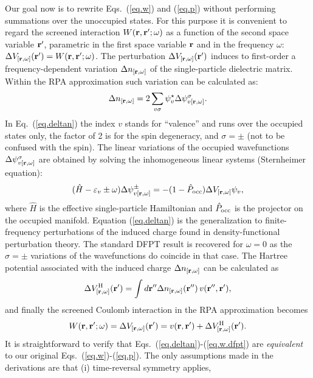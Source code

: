 \documentclass[twocolumn,prb,showpacs,superscriptaddress]{revtex4}
\def\w{\omega}
\def\H{\hat{H}}
\def\P{\hat{P}_{\rm occ}}
\def\E{\varepsilon}
\def\s{\sigma}
\def\r{{\bf r}}
\def\rp{{\bf r^\prime}}
\def\rpp{{\bf r^{\prime\prime}}}
\begin{document}
Our goal now is to rewrite Eqs.\ (\ref{eq.w}) and (\ref{eq.p})
without performing summations over the unoccupied states.
For this purpose it is convenient to regard the screened interaction
$W(\r,\rp;\w)$ as a function of the 
second space variable $\rp$, parametric in the first space variable 
$\r$ and in the frequency $\w$: $\Delta V_{[\r,\w]}(\rp) = W(\r,\rp;\w)$.
The perturbation $\Delta V_{[\r,\w]}(\rp)$ induces to first-order 
a frequency-dependent variation $\Delta n_{[\r,\w]}$ of the single-particle 
dielectric matrix. Within the RPA approximation such
variation can be calculated as:
  \begin{equation}\label{eq.deltan}
  \Delta n_{[\r,\w]} = 2\sum_{v\s} \psi_v^\star  \Delta \psi^\s_{v[\r,\w]}.
  \end{equation}
In Eq.\ (\ref{eq.deltan}) the index $v$ stands for ``valence'' and runs
over the occupied states only, the factor of 2 is for the spin degeneracy, 
and $\sigma=\pm$ (not to be confused with the spin).
The linear variations of the occupied wavefunctions $\Delta \psi^\s_{v[\r,\w]}$
are obtained by solving the inhomogeneous linear systems (Sternheimer equation):
  \begin{equation}\label{eq.linsys.1}
  (\H-\E_v\pm\w) \Delta \psi^\pm_{v[\r,\w]}  = -(1-\P)  \Delta V_{[\r,\w]} \psi_v, 
  \end{equation}
where $\H$ is the effective single-particle Hamiltonian and $\P$ is the projector
on the occupied manifold. 
Equation (\ref{eq.deltan}) is the generalization to finite-frequency perturbations
of the induced charge found in density-functional perturbation theory.\cite{baroni.rmp} 
The standard DFPT result is recovered for $\w=0$ as the $\sigma=\pm$ variations
of the wavefunctions do coincide in that case.
The Hartree potential associated with the induced charge $\Delta n_{[\r,\w]}$
can be calculated as
  \begin{equation}
  \Delta V^{\rm H}_{[\r,\w]}(\rp) = \int d\rpp \Delta n_{[\r,\w]} (\rpp) \, v(\rpp,\rp),
  \end{equation}
and finally the screened Coulomb interaction in the RPA approximation becomes
  \begin{equation}\label{eq.w.dfpt}
  W(\r,\rp;\w) = \Delta V_{[\r,\w]}(\rp) = v(\r,\rp) + \Delta V^{\rm H}_{[\r,\w]}(\rp).
  \end{equation}
It is straightforward to verify that Eqs.\ (\ref{eq.deltan})-(\ref{eq.w.dfpt})
are {\it equivalent} to our original Eqs.\ (\ref{eq.w})-(\ref{eq.p}).
The only assumptions made in the derivations are that (i) time-reversal symmetry applies,
\end{document}
